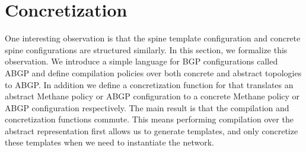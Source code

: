 \documentclass[numbers, 10pt, preprint]{sigplanconf}
\newcommand{\IE}{\emph{i.e.}}
\newcommand{\sysname}{{\small \sf Methane}\xspace}
\newcommand{\para}[1]{\paragraph*{\textbf{#1}}}
\begin{document}






\section{Concretization}

One interesting observation is that the spine template configuration and concrete spine configurations are structured similarly. In this section, we formalize this observation. We introduce a simple language for BGP configurations called ABGP and define compilation policies over both concrete and abstract topologies to ABGP. In addition we define a concretization function for that translates an abstract \sysname policy or ABGP configuration to a concrete \sysname policy or ABGP configuration respectively. The main result is that the compilation and concretization functions commute. This means performing compilation over the abstract representation first allows us to generate templates, and only concretize these templates when we need to instantiate the network.


%
\end{document}
